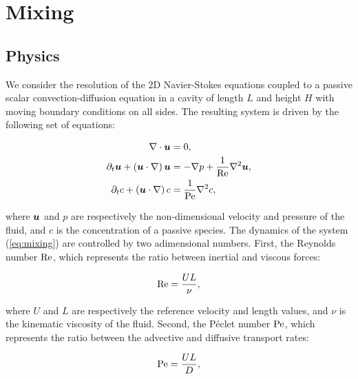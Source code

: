 \chapter{Mixing}

\section{Physics}

We consider the resolution of the 2D Navier-Stokes equations coupled to a passive scalar convection-diffusion equation in a cavity of length $L$ and height $H$ with moving boundary conditions on all sides. The resulting system is driven by the following set of equations:

\begin{equation}
\label{eq:mixing}
\begin{split}
	\nabla \cdot \bm{u} 						&= 0, \\
	\partial_t \bm{u} + (\bm{u} \cdot \nabla) \, \bm{u} 	&= -\nabla p + \frac{1}{\text{Re}} \nabla^2 \bm{u}, \\
	\partial_t c + (\bm{u} \cdot \nabla) \, c 			&= \frac{1}{\text{Pe}} \nabla^2 c,
\end{split}
\end{equation}

where $\bm{u}$ and $p$ are respectively the non-dimensional velocity and pressure of the fluid, and $c$ is the concentration of a passive species. The dynamics of the system (\ref{eq:mixing}) are controlled by two adimensional numbers. First, the Reynolds number $\text{Re}$, which represents the ratio between inertial and viscous forces:

\begin{equation*}
	\text{Re} = \frac{U L}{\nu},
\end{equation*}

where $U$ and $L$ are respectively the reference velocity and length values, and $\nu$ is the kinematic viscosity of the fluid. Second, the P\'eclet number $\text{Pe}$, which represents the ratio between the advective and diffusive transport rates:

\begin{equation*}
	\text{Pe} = \frac{U L}{D},
\end{equation*}

